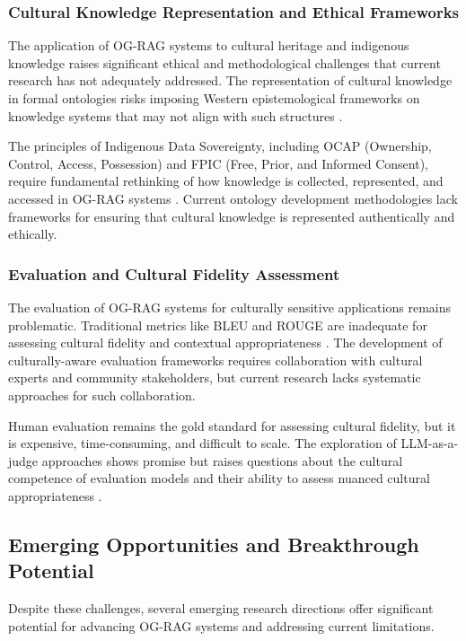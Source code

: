 \subsubsection{Cultural Knowledge Representation and Ethical Frameworks}

The application of OG-RAG systems to cultural heritage and indigenous knowledge raises significant ethical and methodological challenges that current research has not adequately addressed. The representation of cultural knowledge in formal ontologies risks imposing Western epistemological frameworks on knowledge systems that may not align with such structures \cite{christie2019indigenous}.

The principles of Indigenous Data Sovereignty, including OCAP (Ownership, Control, Access, Possession) and FPIC (Free, Prior, and Informed Consent), require fundamental rethinking of how knowledge is collected, represented, and accessed in OG-RAG systems \cite{carroll2020care}. Current ontology development methodologies lack frameworks for ensuring that cultural knowledge is represented authentically and ethically.

\subsubsection{Evaluation and Cultural Fidelity Assessment}

The evaluation of OG-RAG systems for culturally sensitive applications remains problematic. Traditional metrics like BLEU and ROUGE are inadequate for assessing cultural fidelity and contextual appropriateness \cite{brown2023figurative}. The development of culturally-aware evaluation frameworks requires collaboration with cultural experts and community stakeholders, but current research lacks systematic approaches for such collaboration.

Human evaluation remains the gold standard for assessing cultural fidelity, but it is expensive, time-consuming, and difficult to scale. The exploration of LLM-as-a-judge approaches shows promise but raises questions about the cultural competence of evaluation models and their ability to assess nuanced cultural appropriateness \cite{wang2024pandalm}.

\subsection{Emerging Opportunities and Breakthrough Potential}

Despite these challenges, several emerging research directions offer significant potential for advancing OG-RAG systems and addressing current limitations.

